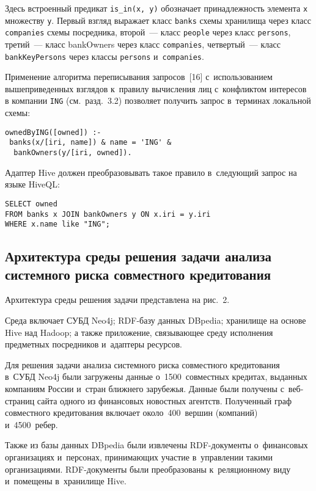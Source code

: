 \begin{multicols}{2}
    \noindent
      Здесь встроенный предикат \verb"is_in(x, y)" обозначает принадлежность 
элемента \verb"x" множеству \verb"y". Первый взгляд выражает класс 
\verb"banks" схемы хранилища через класс \verb"companies" схемы посредника, 
\mbox{второй}~--- класс \verb"people" через класс \verb"persons", третий~--- класс 
bankOwners через класс \verb"companies", четвертый~--- класс 
\verb"bankKeyPersons" через классы \verb"persons" и~\verb"companies".
      
      Применение алгоритма переписывания запросов~[16] с~использованием 
вышеприведенных взглядов к~правилу вычисления лиц с~конфликтом интересов 
в компании \verb"ING" (см.\ разд.~3.2) позволяет получить запрос в~терминах 
локальной схемы:
      \begin{verbatim}
ownedByING([owned]) :-
 banks(x/[iri, name]) & name = 'ING' &
  bankOwners(y/[iri, owned]).
\end{verbatim}

   \noindent
      Адаптер Hive должен преобразовывать такое правило в~следующий 
запрос на языке HiveQL:
      {\small\begin{verbatim}
SELECT owned
FROM banks x JOIN bankOwners y ON x.iri = y.iri
WHERE x.name like "ING";
\end{verbatim}
}

\subsection{Архитектура среды решения задачи анализа системного риска 
совместного кредитования}
      
      Архитектура среды решения задачи представлена на рис.~2.


      Среда включает СУБД Neo4j; RDF-базу данных DBpedia; хранилище на 
основе Hive над Hadoop; а также приложение, связывающее среду исполнения 
предметных посредников и~адаптеры ресурсов.
      
      Для решения задачи анализа системного риска совместного 
кредитования в~СУБД Neo4j были загружены данные о~1500~совместных 
кредитах, выданных компаниям России и~стран ближнего зарубежья. Данные 
были получены с~веб-стра\-ниц сайта одного из финансовых новостных 
агентств. Полученный граф совместного кредитования включает 
около~400~вершин (компаний) и~4500~ребер.
      
      Также из базы данных DBpedia были извлечены RDF-до\-ку\-менты 
о~финансовых организациях и~персонах, принимающих участие в~управ\-ле\-нии 
такими организациями. RDF-до\-ку\-мен\-ты были преобразованы 
к~реляционному виду и~помещены в~хранилище Hive.
      

\end{multicols}

